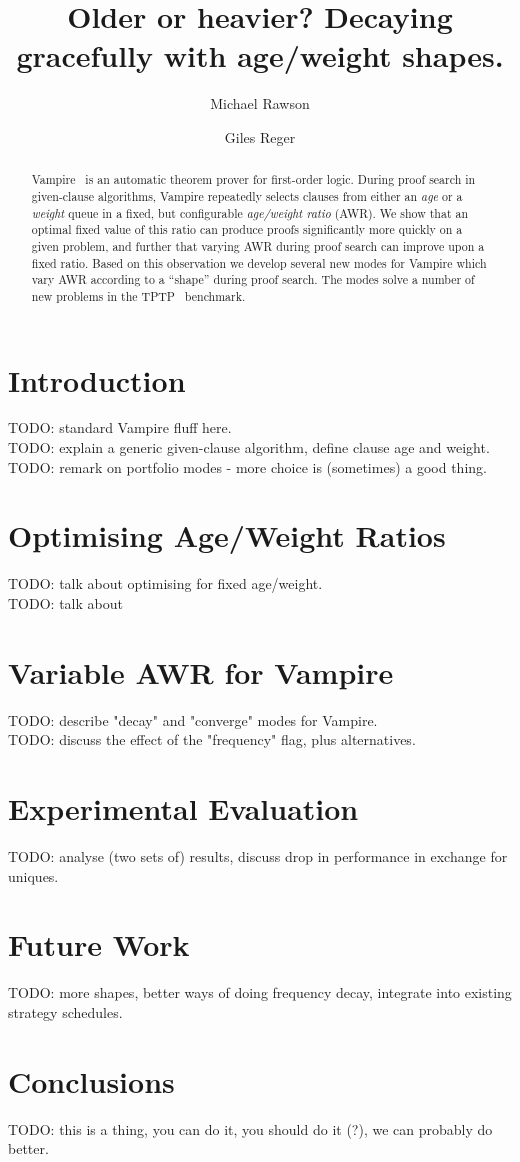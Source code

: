 \documentclass{llncs}
\title{Older or heavier? Decaying gracefully with age/weight shapes.}
\author{Michael Rawson \and Giles Reger}
\institute{University of Manchester, Manchester, UK}
\begin{document}
\maketitle
\begin{abstract}
Vampire~\cite{vampire} is an automatic theorem prover for first-order logic.
During proof search in given-clause algorithms, Vampire repeatedly selects clauses from either an \emph{age} or a \emph{weight} queue in a fixed, but configurable \emph{age/weight ratio} (AWR).
We show that an optimal fixed value of this ratio can produce proofs significantly more quickly on a given problem, and further that varying AWR during proof search can improve upon a fixed ratio.
Based on this observation we develop several new modes for Vampire which vary AWR according to a ``shape'' during proof search.
The modes solve a number of new problems in the TPTP~\cite{tptp} benchmark.
\end{abstract}

\section{Introduction}
TODO: standard Vampire fluff here.\\
TODO: explain a generic given-clause algorithm, define clause age and weight.\\
TODO: remark on portfolio modes - more choice is (sometimes) a good thing.

\section{Optimising Age/Weight Ratios}
TODO: talk about optimising for fixed age/weight.\\
TODO: talk about

\section{Variable AWR for Vampire}
TODO: describe "decay" and "converge" modes for Vampire.\\
TODO: discuss the effect of the "frequency" flag, plus alternatives.

\section{Experimental Evaluation}
TODO: analyse (two sets of) results, discuss drop in performance in exchange for uniques.

\section{Future Work}
TODO: more shapes, better ways of doing frequency decay, integrate into existing strategy schedules.

\section{Conclusions}
TODO: this is a thing, you can do it, you should do it (?), we can probably do better.



\end{document}
